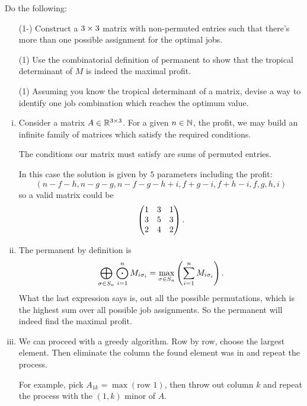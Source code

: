 \documentclass[12pt]{memoir}
\begin{document}
\begin{Ej}
    Do the following:
    \begin{enumerate}[i)]
        \itemsep=-0.4em
        \item[(1-)] Construct a $3\times3$ matrix with non-permuted entries such that there's more than one possible assignment for the optimal jobs.
        \item[(1)] Use the combinatorial definition of permanent to show that the tropical determinant of $M$ is indeed the maximal profit. 
        \item[(1)] Assuming you know the tropical determinant of a matrix, devise a way to identify one job combination which reaches the optimum value. 
    \end{enumerate}
\end{Ej}

\begin{ptcb}
    \begin{enumerate}[i)]
        \itemsep=-0.4em
        \item Consider a matrix $A\in \mathbb{R}^{3\times3}$. For a given $n\in\mathbb{N}$, the profit, we may build an infinite family of matrices which satisfy the required conditions.\par 
        The conditions our matrix must satisfy are sums of permuted entries.\par 
        In this case the solution is given by $5$ parameters including the profit:
        $$(n-f-h,n-g-g,n-f-g-h+i,f+g-i,f+h-i,f,g,h,i)$$
        so a valid matrix could be 
        $$\begin{pmatrix} 1 & 3 & 1 \\ 3 & 5 & 3 \\ 2 & 4 & 2 \end{pmatrix}.$$
        \item The permanent by definition is 
        $$\bigoplus_{\sigma\in S_n}\bigodot_{i=1}^n M_{i\sigma_i}=\max_{\sigma\in S_n}\left(\sum_{i=1}^n M_{i\sigma_i}\right).$$
        What the last expression says is, out all the possible permutations, which is the highest sum over all possible job assignments. So the permanent will indeed find the maximal profit.
        \item We can proceed with a greedy algorithm. Row by row, choose the largest element. Then eliminate the column the found element was in and repeat the process.\par 
        For example, pick $A_{1k}=\max(\text{row }1)$, then throw out column $k$ and repeat the process with the $(1,k)$ minor of $A$. 
    \end{enumerate}
\end{ptcb}
\end{document}
